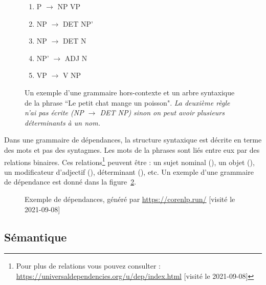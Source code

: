 \documentclass{KodeBook}
\begin{document}
\begin{figure}[ht]
	\centering
	\begin{minipage}{0.3\textwidth}
		\begin{enumerate}
			\item P $ \rightarrow $ NP VP
			\item NP $ \rightarrow $ DET NP'
			\item NP $ \rightarrow $ DET N
			\item NP' $ \rightarrow $ ADJ N
			\item VP $ \rightarrow $ V NP
		\end{enumerate}
	\end{minipage}
	\begin{minipage}{0.3\textwidth}
	\end{minipage}

	\caption[Un exemple d'une grammaire hors-contexte et un arbre syntaxique]{Un exemple d'une grammaire hors-contexte et un arbre syntaxique de la phrase ``Le petit chat mange un poisson". \textit{La deuxième règle n'ai pas écrite (NP $ \rightarrow $ DET NP) sinon on peut avoir plusieurs déterminants à un nom.}\label{fig.exp-gram-const}}

\end{figure}

Dans une grammaire de dépendances, la structure syntaxique est décrite en terme des mots et pas des syntagmes.
Les mots de la phrases sont liés entre eux par des relations binaires. 
Ces relations\footnote{Pour plus de relations vous pouvez consulter : \url{https://universaldependencies.org/u/dep/index.html} [visité le 2021-09-08]} peuvent être : un sujet nominal (), un objet (), un modificateur d'adjectif (), déterminant (), etc.
Un exemple d'une grammaire de dépendance est donné dans la figure~\ref{fig:exp-gram-dep}.

\begin{figure}[ht]
	\centering
	\caption[Exemple de dépendances]{Exemple de dépendances, généré par \url{https://corenlp.run/} [visité le 2021-09-08] \label{fig:exp-gram-dep}}
\end{figure}

\subsection{Sémantique}
\end{document}
